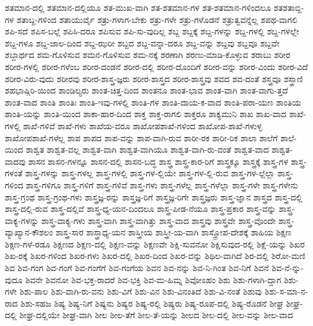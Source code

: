 {ಶತಮಾನ-ದಲ್ಲಿ
ಶತಮಾನ-ದಲ್ಲಿಯೂ
ಶತ-ಮುಖ-ವಾಗಿ
ಶತ-ಶತಮಾನ-ಗಳ
ಶತ-ಶತಮಾನ-ಗಳಿಂದಲೂ
ಶತಶತಾಬ್ದಿ-ಗಳ
ಶತಾಬ್ದ-ಗಳಿಂದ
ಶತಾಯುರ್ವೈ
ಶತ್ರು-ಗಳಾಗ-ಬೇಕು
ಶತ್ರು-ಗಳೇ
ಶತ್ರು-ಗಳೊಡನೆ
ಶತ್ರುತ್ವವನ್ನೆಲ್ಲ
ಶಪಥ-ವಾಗಲಿ
ಶಪಿ-ಸದೆ
ಶಪಿಸ-ಬಲ್ಲೆ
ಶಪಿಸಿ-ದರೂ
ಶಪಿಸುವ
ಶಪಿ-ಸು-ವುದಿಲ್ಲ
ಶಬ್ದ
ಶಬ್ದಕ್ಕೆ
ಶಬ್ದ-ಗಳನ್ನು
ಶಬ್ದ-ಗಳಲ್ಲಿ
ಶಬ್ದ-ಗಳಲ್ಲೇ
ಶಬ್ದ-ಗಳೂ
ಶಬ್ದ-ಜಾಲ-ದಿಂದ
ಶಬ್ದ-ಝರೀ
ಶಬ್ದದ
ಶಬ್ದ-ವನ್ನಾ-ದರೂ
ಶಬ್ದ-ವನ್ನು
ಶಬ್ದವು
ಶಬ್ದವೂ
ಶಬ್ದವೇ
ಶಬ್ದಾರ್ಥದ
ಶಮ-ಗೊಳಿಸುವ
ಶಮನ-ಗೊಳಿಸುವ
ಶಮ-ನಕ್ಕೆ
ಶರಣಾಗಿ
ಶರಣು-ಮಾಡಿ-ಕೊಳ್ಳುವ
ಶರಾಬು
ಶರೀರ
ಶರೀರ-ಗಳಲ್ಲಿ
ಶರೀರ-ಗಳೆಂಬ
ಶರೀರ-ದಂಡನೆ
ಶರೀರ-ದಲ್ಲಿ
ಶರೀರ-ದೊಂದಿಗೆ
ಶರೀರ-ವನ್ನು
ಶರೀರ-ವಿಂದು
ಶರೀರ-ವಿದೆ
ಶರೀರ-ವಿರು-ವುದು
ಶರೀರವು
ಶರೀರ-ಶಾಸ್ತ್ರ-ಜ್ಞರು
ಶರೀರ-ಶಾಸ್ತ್ರದ
ಶರೀರ-ಶಾಸ್ತ್ರವು
ಶವದ
ಶವ-ದಂತೆ
ಶಸ್ತ್ರವೂ
ಶಸ್ತ್ರಾಣಿ
ಶಹಭಾಷ್ಗಿರಿ-ಯಿಂದ
ಶಾಂಡಿಲ್ಯರು
ಶಾಂತ-ಚಿತ್ತ-ದಿಂದ
ಶಾಂತನೂ
ಶಾಂತ-ಭಾವ
ಶಾಂತ-ವಾಗಿ
ಶಾಂತ-ವಾಗು-ತ್ತದೆ
ಶಾಂತ-ವಾದ
ಶಾಂತಿ
ಶಾಂತಿಃ
ಶಾಂತಿ-ಇವು-ಗಳಲ್ಲಿ
ಶಾಂತಿ-ಗಳ
ಶಾಂತಿ-ದಾಯ-ಕ-ವಾದ
ಶಾಂತಿ-ಪರಾ-ಯಣ
ಶಾಂತಿಯ
ಶಾಂತಿ-ಯನ್ನು
ಶಾಂತಿ-ಯಿಂದ
ಶಾಕಾ-ಹಾರ-ದಿಂದ
ಶಾಕ್ತ
ಶಾಕ್ತ-ರಾಗಲಿ
ಶಾಕ್ತರೂ
ಶಾಕ್ಯಮುನಿ
ಶಾಖ
ಶಾಖ-ವಾದ
ಶಾಖೆ-ಗಳಲ್ಲಿ
ಶಾಖೆ-ಗಳಿವೆ
ಶಾಖೆ-ಗಳು
ಶಾಖೆಯ-ವರೂ
ಶಾಖೋಪಶಾಖೆ-ಗಳಿಂದ
ಶಾಖೋಪ-ಶಾಖೆ-ಗಳುಳ್ಳ
ಶಾಖೋಪಶಾಖೆ-ಗಳೆಲ್ಲ
ಶಾಪ
ಶಾಪದ
ಶಾಪ-ವನ್ನು
ಶಾಪ-ವಾಗಿ-ರುವ
ಶಾರೀ-ರಕ
ಶಾರೀ-ರಿಕ
ಶಾಲಾ
ಶಾಲೆಗೆ
ಶಾಲೆ-ಯಿಂದ
ಶಾಶ್ವತ
ಶಾಶ್ವತ-ವಲ್ಲ
ಶಾಶ್ವತ-ವಾಗಿ
ಶಾಶ್ವತ-ವಾಗಿಯೂ
ಶಾಶ್ವತ-ವಾಗಿ-ರು-ವಂತೆ
ಶಾಶ್ವತ-ವಾದ
ಶಾಶ್ವತ-ವಾದವು
ಶಾಸನ
ಶಾಸನ-ಗಳನ್ನೂ
ಶಾಸನ-ದಲ್ಲಿ
ಶಾಸನ-ಬದ್ಧ
ಶಾಸ್ತ್ರ
ಶಾಸ್ತ್ರ-ಕಾರ-ರಿಗೆ
ಶಾಸ್ತ್ರಕ್ಕೂ
ಶಾಸ್ತ್ರಕ್ಕೆ
ಶಾಸ್ತ್ರ-ಗಳ
ಶಾಸ್ತ್ರ-ಗಳಂತೆ
ಶಾಸ್ತ್ರ-ಗಳನ್ನು
ಶಾಸ್ತ್ರ-ಗಳಲ್ಲ
ಶಾಸ್ತ್ರ-ಗಳಲ್ಲಿ
ಶಾಸ್ತ್ರ-ಗಳ-ಲ್ಲಿಯೇ
ಶಾಸ್ತ್ರ-ಗಳ-ಲ್ಲಿ-ರುವ
ಶಾಸ್ತ್ರ-ಗಳ-ಲ್ಲೆಲ್ಲಾ
ಶಾಸ್ತ್ರ-ಗಳಿಂದ
ಶಾಸ್ತ್ರ-ಗಳಿಗೂ
ಶಾಸ್ತ್ರ-ಗಳಿಗೆ
ಶಾಸ್ತ್ರ-ಗಳಿವೆ
ಶಾಸ್ತ್ರ-ಗಳು
ಶಾಸ್ತ್ರ-ಗಳೆಲ್ಲ
ಶಾಸ್ತ್ರ-ಗಳೆಲ್ಲಾ
ಶಾಸ್ತ್ರ-ಗಳೇ
ಶಾಸ್ತ್ರ-ಗಳೇನು
ಶಾಸ್ತ್ರ-ಗ್ರಂಥ
ಶಾಸ್ತ್ರ-ಗ್ರಂಥ-ಗಳು
ಶಾಸ್ತ್ರಜ್ಞ-ರನ್ನು
ಶಾಸ್ತ್ರಜ್ಞ-ರಿಗೆ
ಶಾಸ್ತ್ರಜ್ಞ-ರಿಗೇ
ಶಾಸ್ತ್ರಜ್ಞರು
ಶಾಸ್ತ್ರ-ಜ್ಞಾನ
ಶಾಸ್ತ್ರದ
ಶಾಸ್ತ್ರ-ದಲ್ಲಿ
ಶಾಸ್ತ್ರ-ದಲ್ಲಿ-ರುವ
ಶಾಸ್ತ್ರ-ದಲ್ಲಿವೆ
ಶಾಸ್ತ್ರ-ಧ್ಯ-ಯನ-ದಿಂದಲೂ
ಶಾಸ್ತ್ರ-ಪೀಡ-ನೆಯೂ
ಶಾಸ್ತ್ರ-ಪ್ರಕಾರ
ಶಾಸ್ತ್ರ-ವನ್ನು
ಶಾಸ್ತ್ರ-ವಾಕ್ಯ-ಗಳನ್ನು
ಶಾಸ್ತ್ರ-ವಾಕ್ಯ-ಗಳು
ಶಾಸ್ತ್ರ-ವಾಗಿ
ಶಾಸ್ತ್ರ-ವಾಗಿತ್ತು
ಶಾಸ್ತ್ರ-ವಾದ
ಶಾಸ್ತ್ರವು
ಶಾಸ್ತ್ರವೇ
ಶಾಸ್ತ್ರ-ವೊಂದೇ
ಶಾಸ್ತ್ರ-ವ್ಯಾಖ್ಯಾನ-ಕೌಶಲಂ
ಶಾಸ್ತ್ರ-ಸಾರ
ಶಾಸ್ತ್ರಾಧ್ಯ-ಯನ
ಶಾಸ್ತ್ರೀಯ
ಶಾಸ್ತ್ರೀ-ಯ-ವಾಗಿ
ಶಾಸ್ತ್ರೋಪ-ದೇಶಕ್ಕೆ
ಶಾಹಿಯ
ಶಿಕ್ಷಣ
ಶಿಕ್ಷಣ-ಗಳೆ-ರಡೂ
ಶಿಕ್ಷಣದ
ಶಿಕ್ಷಣ-ದಲ್ಲಿ
ಶಿಕ್ಷಣ-ವನ್ನು
ಶಿಕ್ಷಣವೇ
ಶಿಕ್ಷಿ-ಸುವನೋ
ಶಿಕ್ಷಿಸುವುದ-ರಲ್ಲಿ
ಶಿಕ್ಷೆ-ಯನ್ನು
ಶಿಖರ
ಶಿಖ-ರಕ್ಕೆ
ಶಿಖರ-ಗಳಿಂದ
ಶಿಖರ-ಗಳು
ಶಿಖರ-ದಲ್ಲಿ
ಶಿಖರ-ದಿಂದ
ಶಿಖರ-ವನ್ನು
ಶಿಥಿಲ-ವಾಗಿದೆ
ಶಿರ-ದಲ್ಲಿ
ಶಿರೋ-ಮಣಿ
ಶಿವ
ಶಿವ-ಗಂಗ
ಶಿವ-ಗಂಗೆ
ಶಿವ-ಗಂಗೆಗೆ
ಶಿವ-ಗಂಗೆಯ
ಶಿವನ
ಶಿವ-ನನ್ನು
ಶಿವ-ನಿ-ಗಿಂತ
ಶಿವ-ನಿಗೆ
ಶಿವನೆ
ಶಿವ-ನೆ-ನ್ನು-ವುದೂ
ಶಿವನೇ
ಶಿವನೋ
ಶಿವ-ಭಕ್ತ-ರಾದರೆ
ಶಿವ-ಭಕ್ತಿ
ಶಿವ-ಮ-ಹಿಮ್ನ
ಶಿವೋಽಹಂ
ಶಿಶು
ಶಿಶು-ಗಳಾಗಿ-ದ್ದಾಗ
ಶಿಶು-ಗಳೇ
ಶಿಶು-ಪಾಲ
ಶಿಶು-ವಾಗಿ-ರು-ವನು
ಶಿಶು-ವಿಗೆ
ಶಿಶು-ವಿನ
ಶಿಶು-ವಿನಂತಿದೆ
ಶಿಶು-ವಿ-ನಂತೆ
ಶಿಶುವು
ಶಿಶು-ಸ-ಮಾ-ನ-ರಾದ
ಶಿಶು-ಸಹಜ
ಶಿಷ್ಯ
ಶಿಷ್ಯ-ನಿಗೆ
ಶಿಷ್ಯನು
ಶಿಷ್ಯರ
ಶಿಷ್ಯ-ರಲ್ಲಿ
ಶಿಷ್ಯರು
ಶಿಷ್ಯ-ರೂಪ-ದಲ್ಲಿ
ಶಿಷ್ಯ-ರೊಡನೆ
ಶೀಘ್ರ
ಶೀಘ್ರ-ದಲ್ಲಿ
ಶೀಘ್ರ-ದಲ್ಲಿಯೇ
ಶೀಘ್ರ-ವಾಗಿ
ಶೀಲ
ಶೀಲ-ತೆಗೆ
ಶೀಲ-ತೆ-ಯನ್ನು
ಶೀಲದ
ಶೀಲ-ದಲ್ಲಿ
ಶೀಲ-ವನ್ನು
ಶೀಲ-ವಾದ
}

